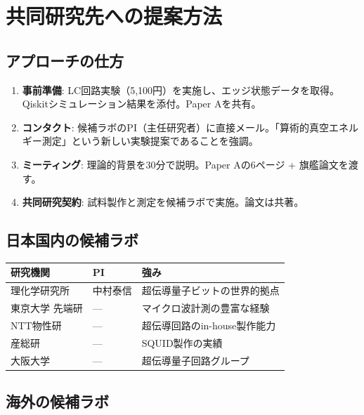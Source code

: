 \documentclass[12pt,a4paper]{article}
\begin{document}
\section{共同研究先への提案方法}

\subsection{アプローチの仕方}

\begin{enumerate}
\item \textbf{事前準備}: LC回路実験（5,100円）を実施し、エッジ状態データを取得。Qiskitシミュレーション結果を添付。Paper Aを共有。
\item \textbf{コンタクト}: 候補ラボのPI（主任研究者）に直接メール。「算術的真空エネルギー測定」という新しい実験提案であることを強調。
\item \textbf{ミーティング}: 理論的背景を30分で説明。Paper Aの6ページ + 旗艦論文を渡す。
\item \textbf{共同研究契約}: 試料製作と測定を候補ラボで実施。論文は共著。
\end{enumerate}

\subsection{日本国内の候補ラボ}

\begin{table}[h]
\centering
\small
\begin{tabular}{@{}lll@{}}
\toprule
研究機関 & PI & 強み \\
\midrule
理化学研究所 & 中村泰信 & 超伝導量子ビットの世界的拠点 \\
東京大学 先端研 & --- & マイクロ波計測の豊富な経験 \\
NTT物性研 & --- & 超伝導回路のin-house製作能力 \\
産総研 & --- & SQUID製作の実績 \\
大阪大学 & --- & 超伝導量子回路グループ \\
\bottomrule
\end{tabular}
\end{table}

\subsection{海外の候補ラボ}
\end{document}
